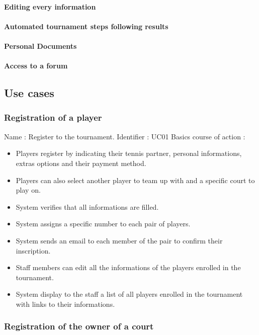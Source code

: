 \paragraph{Editing every information}
\paragraph{Automated tournament steps following results}
\paragraph{Personal Documents}
\paragraph{Access to a forum}

\subsection{Use cases}
\subsubsection{Registration of a player}

Name : Register to the tournament. \newline
Identifier : UC01 \newline
Basics course of action : \newline
\begin{itemize}
	\item Players register by indicating their tennis partner, personal informations, extras 	options and their payment method.
	\item Players can also select another player to team up with and a specific court to play on.
	\item System verifies that all informations are filled.
	\item System assigns a specific number to each pair of players.
	\item System sends an email to each member of the pair to confirm their inscription.
	\item Staff members can edit all the informations of the players enrolled in the tournament.
	\item System display to the staff a list of all players enrolled in the tournament with links to their informations.
\end{itemize}

\subsubsection{Registration of the owner of a court}

